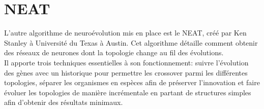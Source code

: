 \documentclass{article}
\begin{document}
\newpage

\section{NEAT}

L'autre algorithme de neuroévolution mis en place est le NEAT, créé par Ken Stanley à Université du Texas à Austin. Cet algorithme détaille comment obtenir des réseaux de neurones dont la topologie change au fil des évolutions.\\
Il apporte trois techniques essentielles à son fonctionnement: suivre l'évolution des gènes avec un historique pour permettre les crossover parmi les différentes topologies, séparer les organismes en espèces afin de préserver l'innovation et faire évoluer les topologies de manière incrémentale en partant de structures simples afin d'obtenir des résultats minimaux\cite{wikineat}.
\end{document}
